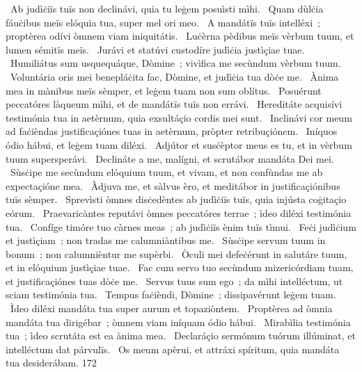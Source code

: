 {~Ab judìċiïs tuïs non declinávi, quia tu leġem posuìsti mìhi.
~Quam dùlċia fáuċibus meïs elóquia tua, super mel ori meo.
~A mandátïs tuïs intelléxi~; proptèrea odívi òmnem viam iniquitátis.
~Luċèrna pèdibus meïs vèrbum tuum, et lumen sémitïs meïs.
~Jurávi et statúvi custodíre judìċia justìçiae tuae.
~Humiliátus sum usquequáque, Dòmine~; vivìfica me secùndum vèrbum tuum.
~Voluntária oris mei benepláċita fac, Dòmine, et judìċia tua dòċe me.
~Ànima mea in mànibus meïs sèmper, et leġem tuam non sum oblítus.
~Posuérunt peccatóres làqueum mìhi, et de mandátïs tuïs non errávi.
~Hereditáte acquisívi testimónia tua in aetèrnum, quia exsultáçio cordis mei sunt.
~Inclinávi cor meum ad faċièndas justificaçiónes tuas in aetèrnum, pròpter retribuçiónem.
~Iníquos ódio hábui, et leġem tuam diléxi.
~Adjútor et susċèptor meus es tu, et in vèrbum tuum supersperávi.
~Declináte a me, malígni, et scrutábor mandáta Dei mei.
~Sùsċipe me secùndum elóquium tuum, et vivam, et non confùndas me ab expectaçióne mea.
~Àdjuva me, et sàlvus èro, et meditábor in justificaçiónibus tuïs sèmper.
~Sprevìsti òmnes disċedèntes ab judìċiïs tuïs, quia injústa coġitaçio eórum.
~Praevaricàntes reputávi òmnes peccatóres terrae~; ìdeo diléxi testimónia tua.
~Confíge timóre tuo càrnes meas~; ab judìċiïs ènim tuïs tìmui.
~Feċi judìċium et justìçiam~; non tradas me calumniàntibus me.
~Sùsċipe servum tuum in bonum~; non calumnièntur me supèrbi.
~Òculi mei defeċérunt in salutáre tuum, et in elóquium justìçiae tuae.
~Fac cum servo tuo secùndum mizericórdiam tuam, et justificaçiónes tuas dòċe me.
~Servus tuus sum ego~; da mìhi intelléctum, ut sciam testimónia tua.
~Tempus faċièndi, Dòmine~; dissipavérunt leġem tuam.
~Ìdeo diléxi mandáta tua super aurum et topaziòntem.
~Proptèrea ad òmnia mandáta tua dirigébar~; òmnem viam iníquam ódio hábui.
~Mirabìlia testimónia tua~; ìdeo scrutáta est ea ànima mea.
~Declaráçio sermónum tuórum illúminat, et intelléctum dat párvulïs.
~Os meum apèrui, et attráxi spíritum, quia mandáta tua desiderábam.}
{17}{2}
